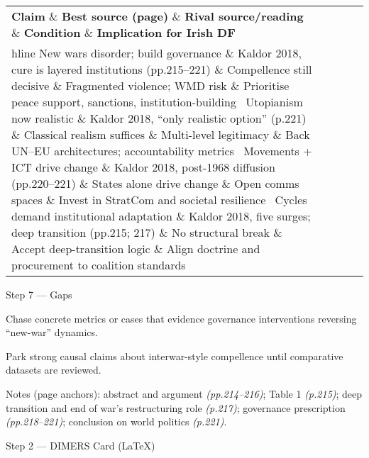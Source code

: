 \begin{tabular}{p{3.2cm}p{4.2cm}p{3.6cm}p{3.2cm}p{4.2cm}}
	\textbf{Claim} \& \textbf{Best source (page)} \& \textbf{Rival source/reading} \& \textbf{Condition} \& \textbf{Implication for Irish DF}\\hline
	New wars disorder; build governance \& Kaldor 2018, cure is layered institutions (pp.215–221) \& Compellence still decisive \& Fragmented violence; WMD risk \& Prioritise peace support, sanctions, institution-building \
	Utopianism now realistic \& Kaldor 2018, “only realistic option” (p.221) \& Classical realism suffices \& Multi-level legitimacy \& Back UN–EU architectures; accountability metrics \
	Movements + ICT drive change \& Kaldor 2018, post-1968 diffusion (pp.220–221) \& States alone drive change \& Open comms spaces \& Invest in StratCom and societal resilience \
	Cycles demand institutional adaptation \& Kaldor 2018, five surges; deep transition (pp.215; 217) \& No structural break \& Accept deep-transition logic \& Align doctrine and procurement to coalition standards \
\end{tabular}

Step 7 — Gaps

Chase concrete metrics or cases that evidence governance interventions reversing “new-war” dynamics.

Park strong causal claims about interwar-style compellence until comparative datasets are reviewed.

Notes (page anchors): abstract and argument \emph{(pp.214–216)}; Table 1 \emph{(p.215)}; deep transition and end of war’s restructuring role \emph{(p.217)}; governance prescription \emph{(pp.218–221)}; conclusion on world politics \emph{(p.221)}.

\parencite{KALDOR_2003}

Step 2 — DIMERS Card (LaTeX)

